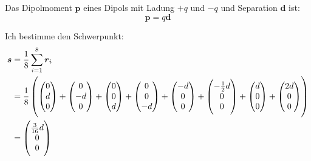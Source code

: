 \documentclass[11pt, ngerman, fleqn]{article}
\newcommand{\half}{\frac 12}
\renewcommand{\vec}[1]{\boldsymbol{#1}}
\begin{document}
Das Dipolmoment $\vec p$ eines Dipols mit Ladung $+q$ und $-q$ und Separation
$\vec d$ ist:
\[
	\vec p = q \vec d
\]

Ich bestimme den Schwerpunkt:
\begin{align*}
	\vec s &= \frac 18 \sum_{i=1}^8 \vec r_i \\
		   &= \frac 18 \del{
		\begin{pmatrix}
			0 \\ d \\ 0
		\end{pmatrix}
		+
		\begin{pmatrix}
			0 \\ -d \\ 0
		\end{pmatrix}
		+
		\begin{pmatrix}
			0 \\ 0 \\ d
		\end{pmatrix}
		+
		\begin{pmatrix}
			0 \\ 0 \\ -d
		\end{pmatrix}
		+
		\begin{pmatrix}
			-d \\ 0 \\ 0
		\end{pmatrix}
		+
		\begin{pmatrix}
			-\half d \\ 0 \\ 0
		\end{pmatrix}
		+
		\begin{pmatrix}
			d \\ 0 \\ 0
		\end{pmatrix}
		+
		\begin{pmatrix}
			2d \\ 0 \\ 0
		\end{pmatrix}
	} \\
	&= \begin{pmatrix}
	\frac 3{16} d \\ 0 \\ 0
	\end{pmatrix}
\end{align*}
\end{document}
